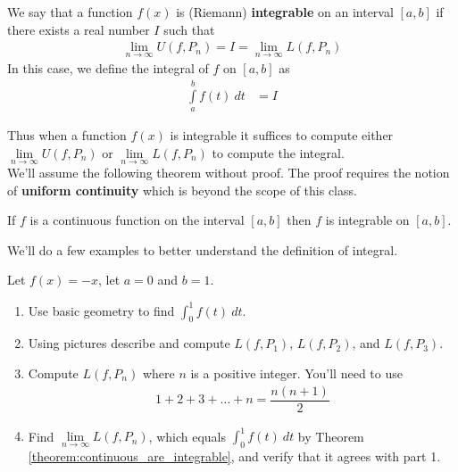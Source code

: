 \begin{definition}
	\label{def:definition_Integral}
	We say that a function $f(x)$ is (Riemann) {\bf integrable} on an interval $[a,b]$ if there exists a real number $I$ such that
	\begin{align*}
		\lim \limits_{ n \rightarrow \infty} U(f,P_n) = I = \lim \limits_{ n \rightarrow \infty} L(f,P_n)
	\end{align*}
	In this case, we define the integral of $f$ on $[a,b]$ as
	\begin{align*}
		\int \limits_{a}^{b} f(t) \: dt & = I
	\end{align*}
\end{definition}
\noindent Thus when a function $f(x)$ is integrable it suffices to compute either $\lim \limits_{ n \rightarrow \infty} U(f,P_n)$ or $\lim \limits_{ n \rightarrow \infty} L(f,P_n)$ to compute the integral. \\

We'll assume the following theorem without proof. The proof requires the notion of {\bf uniform continuity} which is beyond the scope of this class.

\begin{theorem}
	\label{theorem:continuous_are_integrable}
	If $f$ is a continuous function on the interval $[a,b]$ then $f$ is integrable on $[a,b]$.
\end{theorem}

We'll do a few examples to better understand the definition of integral.
\begin{exercise}
	Let $f(x) = -x$, let $a=0$ and $b = 1$.
	\begin{enumerate}
		\item Use basic geometry to find $\int_{0}^1 f(t) \: dt$.
		\item Using pictures describe and compute $L(f,P_1)$, $L(f,P_2)$, and $L(f,P_3)$.
		\item Compute $L(f,P_n)$ where $n$ is a positive integer. You'll need to use
		      \begin{align*}
			      1 + 2 + 3 + \dots + n = \dfrac{n(n+1)}{2}
		      \end{align*}
		\item Find $\lim \limits_{n \rightarrow \infty} L(f,P_n)$, which equals $\int_{0}^1 f(t) \: dt$ by Theorem \ref{theorem:continuous_are_integrable}, and verify that it agrees with part 1.
	\end{enumerate}
\end{exercise}

